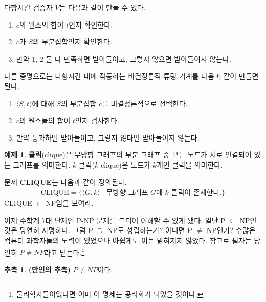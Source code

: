 \documentclass[b5paper, 11pt]{book}
\theoremstyle{definition}
\newtheorem{ex}[defn]{예제}
\newtheorem{conj}[defn]{추측}
\newenvironment{pf*}{\pushQED{\qed}\pf}
{\popQED\endpf}
\begin{document}
\begin{pf*}
    다항시간 검증자 $V$는 다음과 같이 만들 수 있다.
    \begin{enumerate}
        \item $c$의 원소의 합이 $t$인지 확인한다.
        \item $c$가 $S$의 부분집합인지 확인한다.
        \item 만약 1, 2 둘 다 만족하면 받아들이고, 그렇지 않으면 받아들이지 않는다.
    \end{enumerate}
    다른 증명으로는 다항시간 내에 작동하는 비결정론적 튜링 기계를 다음과 같이 만들면 된다.
    \begin{enumerate}
        \item $\langle S, t \rangle$에 대해 $S$의 부분집합 $c$를 비결정론적으로 선택한다.
        \item $c$의 원소들의 합이 $t$인지 검사한다.
        \item 만약 통과하면 받아들이고, 그렇지 않다면 받아들이지 않는다. 
    \end{enumerate}
\end{pf*}
\begin{ex}
    \textbf{클릭}(clique)은 무방향 그래프의 부분 그래프 중 모든 노드가 서로 연결되어 있는 그래프를 의미한다.
    $k$-클릭($k$-clique)은 노드가 $k$개인 클릭을 의미한다.
\begin{figure}[!ht]
    \centering
    \caption{}
\end{figure}
문제 \textbf{CLIQUE}는 다음과 같이 정의된다.
\begin{align*}
    \text{CLIQUE} = \{ \langle G , k \rangle \;\vert\; \text{무방향 그래프 } 
    G\text{에 }k\text{-클릭이 존재한다.}\}
\end{align*}
CLIQUE $\in$ NP임을 보여라.
\end{ex}
이제 수학계 7대 난제인 P-NP 문제를 드디어 이해할 수 있게 됐다. 일단 P $\subseteq$ NP인 것은 당연히 자명하다. 그럼 P $\supseteq$ NP도 성립하는가? 아니면 P $\neq$ NP인가? 수많은 컴퓨터 과학자들의 노력이 있었으나 아쉽게도 이는 밝혀지지 않았다. 참고로 필자는 당연히 $P \neq NP$라고 믿는다.\footnote{물리학자들이었다면 이미 이 명제는 공리화가 되었을 것이다.}
\begin{conj}
    \textbf{(만인의 추측)} $P \neq NP$이다.
\end{conj} 
\end{document}
